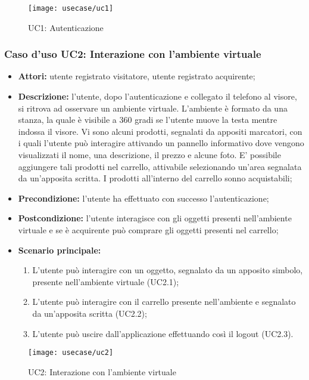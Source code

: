 \label{UC1}
\begin{figure}[ht]
	\begin{center}
		\texttt{[image: usecase/uc1]}
		\caption{UC1: Autenticazione}
	\end{center}
\end{figure}
\FloatBarrier

\subsubsection{Caso d'uso UC2: Interazione con l'ambiente virtuale}

\begin{itemize}
	\item \textbf{Attori:} utente registrato visitatore, utente registrato acquirente;
	\item \textbf{Descrizione:} l'utente, dopo l'autenticazione e collegato il telefono al visore, si ritrova ad osservare un ambiente virtuale. L'ambiente è formato da una stanza, la quale è visibile a 360 gradi se l'utente muove la testa mentre indossa il visore. Vi sono alcuni prodotti, segnalati da appositi marcatori, con i quali l'utente può interagire attivando un pannello informativo dove vengono visualizzati il nome, una descrizione, il prezzo e alcune foto. E' possibile aggiungere tali prodotti nel carrello, attivabile selezionando un'area segnalata da un'apposita scritta. I prodotti all'interno del carrello sonno acquistabili;
	\item \textbf{Precondizione:} l'utente ha effettuato con successo l'autenticazione;
	\item \textbf{Postcondizione:} l'utente interagisce con gli oggetti presenti nell'ambiente virtuale e se è acquirente può comprare gli oggetti presenti nel carrello;
	\item \textbf{Scenario principale:}
	\begin{enumerate}
		\item L'utente può interagire con un oggetto, segnalato da un apposito simbolo, presente nell'ambiente virtuale (UC2.1);
		\item L'utente può interagire con il carrello presente nell'ambiente e segnalato da un'apposita scritta (UC2.2);
		\item L'utente può uscire dall'applicazione effettuando così il logout (UC2.3).
	\end{enumerate}
\end{itemize}

\label{UC2}
\begin{figure}[ht]
	\begin{center}
		\texttt{[image: usecase/uc2]}
		\caption{UC2: Interazione con l'ambiente virtuale}
	\end{center}
\end{figure}
\FloatBarrier

